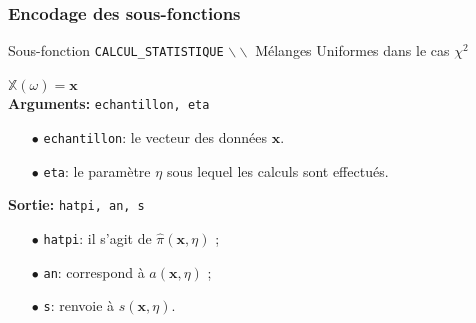 \documentclass{article}
\newenvironment{fonction}[1][htb]
  {\renewcommand{\algorithmcfname}{Fonction}%
   \begin{algorithm}[#1]%
  }{\end{algorithm}}
\begin{document}
    \subsubsection{Encodage des sous-fonctions}
    \begin{fonction}
        \caption{Sous-fonction \texttt{CALCUL\_STATISTIQUE} $\backslash\backslash$ Mélanges Uniformes dans le cas $\chi^2$}
        \Apriori $\mathbb{X}(\omega)=\mathbf{x}$ \\
        \vspace*{0.2cm}
        \textbf{Arguments:} \texttt{echantillon, eta}
        \begin{itemize}
            \item[$\bullet$] \texttt{echantillon}: le vecteur des données $\mathbf{x}$.
            \item[$\bullet$] \texttt{eta}: le paramètre $\eta$ sous lequel les calculs sont effectués. 
        \end{itemize}
        \textbf{Sortie:} \texttt{hatpi, an, s}
        \begin{itemize}
            \item[$\bullet$] \texttt{hatpi}: il s'agit de $\hat\pi(\mathbf{x},\eta)$ ;
            \item[$\bullet$] \texttt{an}: correspond à $a(\mathbf{x},\eta)$ ;
            \item[$\bullet$] \texttt{s}: renvoie à $s(\mathbf{x},\eta)$.   
        \end{itemize}
    \end{fonction}
\end{document}
